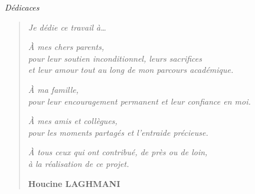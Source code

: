 
\newpage
\thispagestyle{empty}

\vspace*{3cm}

\begin{flushright}
\Large\textit{Dédicaces}
\end{flushright}

\vspace{2cm}

\begin{quote}
\large
\textit{Je dédie ce travail à\ldots}

\vspace{1cm}

\textit{À mes chers parents,}\\
\textit{pour leur soutien inconditionnel, leurs sacrifices}\\
\textit{et leur amour tout au long de mon parcours académique.}

\vspace{0.8cm}

\textit{À ma famille,}\\
\textit{pour leur encouragement permanent et leur confiance en moi.}

\vspace{0.8cm}

\textit{À mes amis et collègues,}\\
\textit{pour les moments partagés et l'entraide précieuse.}

\vspace{0.8cm}

\textit{À tous ceux qui ont contribué, de près ou de loin,}\\
\textit{à la réalisation de ce projet.}

\vspace{1.5cm}

\begin{flushright}
\textbf{Houcine LAGHMANI}
\end{flushright}
\end{quote}

\newpage
